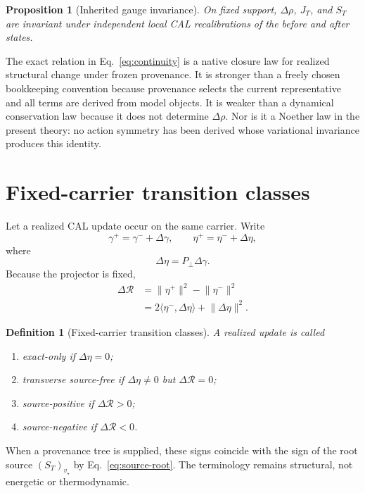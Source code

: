 \documentclass[aip,jmp,amsmath,amssymb,reprint]{revtex4-2}
\newtheorem{definition}{Definition}
\newtheorem{proposition}{Proposition}
\newcommand{\Rcal}{\mathcal{R}}
\begin{document}
\begin{proposition}[Inherited gauge invariance]\label{prop:continuity-gauge}
On fixed support, $\Delta\rho$, $J_T$, and $S_T$ are invariant under independent local CAL recalibrations of the before and after states.
\end{proposition}

The exact relation in Eq.~\eqref{eq:continuity} is a native closure law for realized structural change under frozen provenance. It is stronger than a freely chosen bookkeeping convention because provenance selects the current representative and all terms are derived from model objects. It is weaker than a dynamical conservation law because it does not determine $\Delta\rho$. Nor is it a Noether law in the present theory: no action symmetry has been derived whose variational invariance produces this identity.

\section{Fixed-carrier transition classes}\label{sec:fixed}

Let a realized CAL update occur on the same carrier. Write
\begin{equation}
\gamma^+ = \gamma^-+\Delta\gamma,
\qquad
\eta^+ = \eta^-+\Delta\eta,
\end{equation}
where
\begin{equation}
\Delta\eta=P_\perp\Delta\gamma.
\label{eq:delta-eta}
\end{equation}
Because the projector is fixed,
\begin{align}
\Delta\Rcal
&=\lVert\eta^+\rVert^2-\lVert\eta^-\rVert^2 \\
&=2\langle\eta^-,\Delta\eta\rangle+\lVert\Delta\eta\rVert^2.
\label{eq:fixed-transition-law}
\end{align}

\begin{definition}[Fixed-carrier transition classes]
A realized update is called
\begin{enumerate}
\item \emph{exact-only} if $\Delta\eta=0$;
\item \emph{transverse source-free} if $\Delta\eta\neq0$ but $\Delta\Rcal=0$;
\item \emph{source-positive} if $\Delta\Rcal>0$;
\item \emph{source-negative} if $\Delta\Rcal<0$.
\end{enumerate}
\end{definition}
When a provenance tree is supplied, these signs coincide with the sign of the root source $(S_T)_{v_\star}$ by Eq.~\eqref{eq:source-root}. The terminology remains structural, not energetic or thermodynamic.
\end{document}
